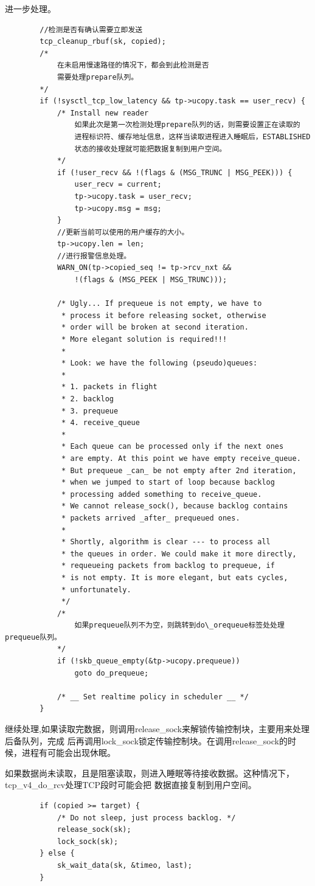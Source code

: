 	进一步处理。
\begin{verbatim}
		//检测是否有确认需要立即发送
		tcp_cleanup_rbuf(sk, copied);
		/*
			在未启用慢速路径的情况下，都会到此检测是否
			需要处理prepare队列。
		*/		
		if (!sysctl_tcp_low_latency && tp->ucopy.task == user_recv) {
			/* Install new reader 
				如果此次是第一次检测处理prepare队列的话，则需要设置正在读取的
				进程标识符、缓存地址信息，这样当读取进程进入睡眠后，ESTABLISHED
				状态的接收处理就可能把数据复制到用户空间。			
			*/
			if (!user_recv && !(flags & (MSG_TRUNC | MSG_PEEK))) {
				user_recv = current;
				tp->ucopy.task = user_recv;
				tp->ucopy.msg = msg;
			}
			//更新当前可以使用的用户缓存的大小。
			tp->ucopy.len = len;
			//进行报警信息处理。
			WARN_ON(tp->copied_seq != tp->rcv_nxt &&
				!(flags & (MSG_PEEK | MSG_TRUNC)));

			/* Ugly... If prequeue is not empty, we have to
			 * process it before releasing socket, otherwise
			 * order will be broken at second iteration.
			 * More elegant solution is required!!!
			 *
			 * Look: we have the following (pseudo)queues:
			 *
			 * 1. packets in flight
			 * 2. backlog
			 * 3. prequeue
			 * 4. receive_queue
			 *
			 * Each queue can be processed only if the next ones
			 * are empty. At this point we have empty receive_queue.
			 * But prequeue _can_ be not empty after 2nd iteration,
			 * when we jumped to start of loop because backlog
			 * processing added something to receive_queue.
			 * We cannot release_sock(), because backlog contains
			 * packets arrived _after_ prequeued ones.
			 *
			 * Shortly, algorithm is clear --- to process all
			 * the queues in order. We could make it more directly,
			 * requeueing packets from backlog to prequeue, if
			 * is not empty. It is more elegant, but eats cycles,
			 * unfortunately.
			 */
			/*
				如果prequeue队列不为空，则跳转到do\_orequeue标签处处理prequeue队列。			
			*/
			if (!skb_queue_empty(&tp->ucopy.prequeue))
				goto do_prequeue;

			/* __ Set realtime policy in scheduler __ */
		}
\end{verbatim}
	
	继续处理,如果读取完数据，则调用release\_sock来解锁传输控制块，主要用来处理后备队列，完成
	后再调用lock\_sock锁定传输控制块。在调用release\_sock的时候，进程有可能会出现休眠。

	如果数据尚未读取，且是阻塞读取，则进入睡眠等待接收数据。这种情况下，tcp\_v4\_do\_rcv处理TCP段时可能会把
	数据直接复制到用户空间。
\begin{verbatim}
		if (copied >= target) {
			/* Do not sleep, just process backlog. */
			release_sock(sk);
			lock_sock(sk);
		} else {
			sk_wait_data(sk, &timeo, last);
		}
\end{verbatim}

